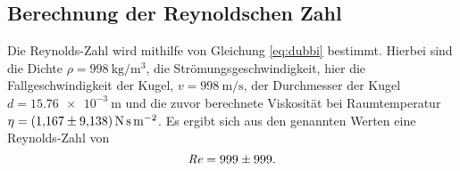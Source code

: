 \subsection{Berechnung der Reynoldschen Zahl}
Die Reynolds-Zahl wird mithilfe von Gleichung \eqref{eq:dubbi} bestimmt.
Hierbei sind die Dichte
\mbox{$\rho = \SI[per-mode=reciprocal]{998}{\kg\per\meter\cubed}$},
die Strömungsgeschwindigkeit, hier die Fallgeschwindigkeit der Kugel,
\mbox{$v = \SI[per-mode=reciprocal]{998}{\meter\per\second}$},
der Durchmesser der Kugel
\mbox{$d = \SI[per-mode=reciprocal]{15.76e-3}{\meter}$}
und die zuvor berechnete Viskosität bei Raumtemperatur
\mbox{$\eta = \SI[per-mode=reciprocal]{1.167\pm9.138}{\newton\second\per\meter\squared}$}.
Es ergibt sich aus den genannten Werten eine Reynolds-Zahl von
\begin{equation}
    \mathit{R\kern-.04em e} = \num{999\pm999}.
\end{equation}
